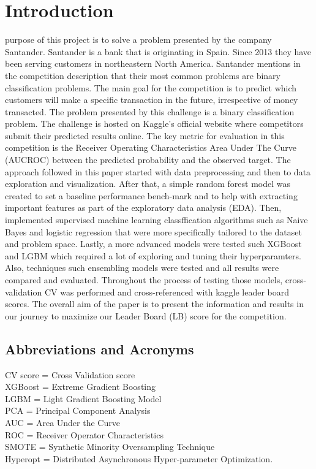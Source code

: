 \documentclass[journal,twoside,web]{ieeecolor}
\begin{document}
\section{Introduction}
\label{sec:introduction}
 purpose of this project is to solve a problem presented by the company Santander. Santander is a bank that is originating in Spain. Since 2013 they have been serving customers in northeastern North America. Santander mentions in the competition description that their most common problems are binary classification problems. The main goal for the competition is to predict which customers will make a specific transaction in the future, irrespective of money transacted. The problem presented by this challenge is a binary classification problem. The challenge is hosted on Kaggle's official website where competitors submit their predicted results online. The key metric for evaluation in this competition is the Receiver Operating Characteristics Area Under The Curve (AUCROC) between the predicted probability and the observed target. The approach followed in this paper started with data preprocessing and then to data exploration and visualization. After that, a simple random forest model was created to set a baseline performance bench-mark and to help with extracting important features as part of the exploratory data analysis (EDA). Then, implemented supervised machine learning classffication algorithms such as Naive Bayes and logistic regression that were more specifically tailored to the dataset and problem space. Lastly, a more advanced models were tested such XGBoost and LGBM which required a lot of exploring and tuning their hyperparamters. Also, techniques such ensembling models were tested and all results were compared and evaluated. Throughout the process of testing those models, cross-validation CV was performed and cross-referenced with kaggle leader board scores. The overall aim of the paper is to present the information and results in our journey to maximize our Leader Board (LB) score for the competition.

\subsection{Abbreviations and Acronyms}

CV score = Cross Validation score \\
XGBoost = Extreme Gradient Boosting  \\
LGBM = Light Gradient Boosting Model \\
PCA = Principal Component Analysis \\
AUC = Area Under the Curve \\
ROC = Receiver Operator Characteristics \\
SMOTE = Synthetic Minority Oversampling Technique \\
Hyperopt = Distributed Asynchronous Hyper-parameter Optimization.
\end{document}
